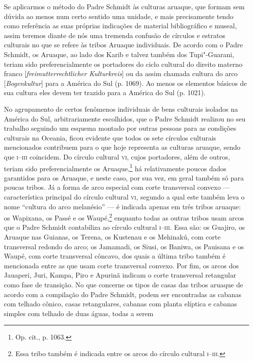 Se aplicarmos o método do Padre Schmidt às culturas aruaque, que formam
sem dúvida ao menos num certo sentido uma unidade, e mais precisamente
tendo como referência as suas próprias indicações de material
bibliográfico e museal, assim teremos diante de nós uma tremenda
confusão de círculos e estratos culturais no que se refere às tribos
Aruaque individuais. De acordo com o Padre Schmidt, os Aruaque, ao lado
dos Karib e talvez também dos Tupi"-Guarani, teriam sido
preferencialmente os portadores do ciclo cultural do direito materno
franco {[}\emph{freimutterrechtlicher Kulturkreis}{]} ou da assim
chamada cultura do arco {[}\emph{Bogenkultur}{]} para a América do Sul
(p. 1069). Ao menos os elementos básicos de sua cultura eles devem ter
trazido para a América do Sul (p. 1021).

No agrupamento de certos fenômenos individuais de bens culturais
isolados na América do Sul, arbitrariamente escolhidos, que o Padre
Schmidt realizou no seu trabalho seguindo um esquema montado por outras
pessoas para as condições culturais na Oceania, ficou evidente que
todos os sete círculos culturais mencionados contribuem para o que hoje
representa as culturas aruaque, sendo que \textsc{i--iii} coincidem. Do círculo
cultural \textsc{vi}, cujos portadores, além de outros, teriam sido
preferencialmente os Aruaque,\footnote{Op. cit., p. 1063.} há
relativamente poucos dados garantidos para os Aruaque, e neste caso,
por sua vez, em geral também só para poucas tribos. Já a forma de arco
especial com corte transversal convexo --- característica principal do
círculo cultural \textsc{vi}, segundo a qual este também leva o nome ``cultura do
arco melanésio'' --- é indicada apenas em três tribos aruaque: os
Wapixana, os Passé e os Waupé,\footnote{Essa tribo também é indicada
  entre os arcos do círculo cultural \textsc{i--iii}.} enquanto todas as outras
tribos usam arcos que o Padre Schmidt contabiliza ao círculo cultural
\textsc{i--iii}. Essa são: os Guajiro, os Aruaque nas Guianas, os Terena, os
Kustenau e os Mehinakú, com corte transversal redondo do arco; os
Jamamadi, os Siusi, os Baniwa, os Pauisana e os Waupé, com corte
transversal côncavo, dos quais a última tribo também é mencionada entre
as que usam corte transversal convexo. Por fim, os arcos dos Jauaperi,
Juri, Kampa, Piro e Apurinã indicam o corte transversal retangular como
fase de transição. No que concerne os tipos de casas das tribos aruaque
de acordo com a compilação do Padre Schmidt, podem ser encontradas as
cabanas com telhado cônico, casas retangulares, cabanas com planta
elíptica e cabanas simples com telhado de duas águas, todas a serem
